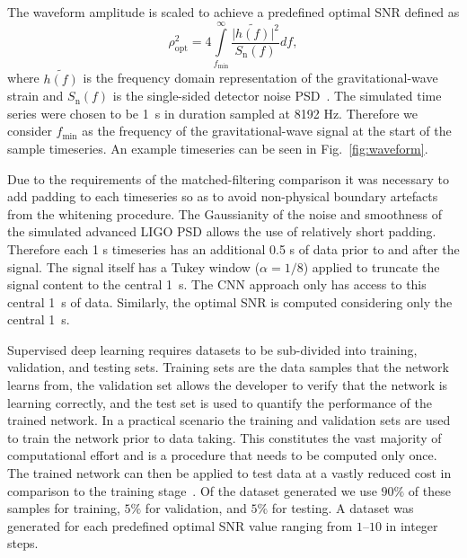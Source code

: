 \documentclass[%
showpacs,
 amsmath,amssymb,
 aps,
 twocolumn,
 prl,
 reprint,
floatfix,
]{revtex4-1}
\newcommand{\fergus}[1]{\textbf{\textcolor{cyan}{FERGUS: #1}}}
\begin{document}

%
%
The waveform amplitude is scaled to achieve a predefined optimal \ac{SNR}
defined as
%
%
\begin{equation}\label{eq:snr} 
\rho_{\mathrm{opt}}^{2} = 4
\int\limits_{f_{\mathrm{min}}}^{\infty} \frac{\lvert
\tilde{h(f)}\rvert^{2}}{S_{\mathrm{n}}(f)} df,
\end{equation}
%
where $\tilde{h(f)}$ is the frequency domain representation of the
gravitational-wave strain and $S_{\mathrm{n}}(f)$ is the single-sided detector noise
\ac{PSD}~\cite{PhysRevD.85.122006}. The simulated time series were chosen to be 1~s in duration sampled
at 8192 Hz. Therefore we consider $f_{\mathrm{min}}$ as the frequency of the
gravitational-wave signal at the start of the sample timeseries. An example
timeseries can be seen in Fig.~\ref{fig:waveform}. 

%
%
Due to the requirements of the matched-filtering comparison it was necessary to
add padding to each timeseries so as to avoid non-physical
boundary artefacts from the whitening procedure. The Gaussianity of the noise
and smoothness of the simulated advanced LIGO \ac{PSD} allows the use of relatively
short padding. Therefore each 1 s timeseries has an additional 0.5 s of
data prior to and after the signal. The signal itself has a Tukey window ($\alpha=1/8$) applied to truncate the
signal content to the central 1~s. The \ac{CNN} approach only has access to
this central 1~s of data. Similarly, the optimal \ac{SNR} is computed considering
only the central 1~s.

%
%
Supervised deep learning requires datasets to be sub-divided into training,
validation, and testing sets. Training sets are the data samples that the
network learns from, the validation set allows the developer to verify that the
network is learning correctly, and the test set is used to quantify the
performance of the trained network.  In a practical
scenario the training and validation sets are used to train the network prior
to data taking. This constitutes the vast majority of computational effort and
is a procedure that needs to be computed only once. The trained network can
then be applied to test data at a vastly reduced cost in comparison to the
training stage~\cite{Goodfellow-et-al-2016}. Of the dataset generated we use $90\%$ of
these samples for training, $5\%$ for validation, and $5\%$ for testing. A
dataset was generated for each predefined optimal \ac{SNR} value ranging
from $1$--$10$ in integer steps. 
\end{document}
